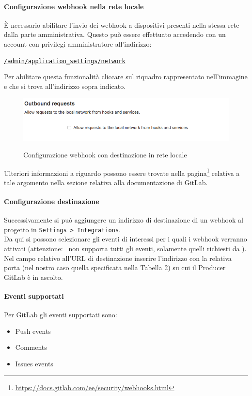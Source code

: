 	\paragraph{Configurazione webhook nella rete locale}
	È necessario abilitare l'invio dei webhook a dispositivi presenti nella stessa rete dalla parte amministrativa.
	Questo può essere effettuato accedendo con un account con privilegi amministratore all'indirizzo:
	\begin{center}
		\texttt{\url{/admin/application_settings/network}}
	\end{center}
	Per abilitare questa funzionalità cliccare sul riquadro rappresentato nell'immagine e che si trova all'indirizzo sopra indicato.
	\begin{figure}[H]
		\centering
		\includegraphics[width=13cm]{img/webhook_gitlab_setup.png}\\
		\caption[Webhook, GitLab]{Configurazione webhook con destinazione in rete locale}
	\end{figure}
	Ulteriori informazioni a riguardo possono essere trovate nella pagina\footnote{\url{https://docs.gitlab.com/ee/security/webhooks.html}} relativa a tale argomento nella sezione relativa alla documentazione di GitLab.	

	\paragraph{Configurazione destinazione}
	Successivamente si può aggiungere un indirizzo di destinazione di un webhook al progetto in \texttt{Settings > Integrations}.\\
	Da qui si possono selezionare gli eventi di interessi per i quali i webhook verranno attivati (attenzione: \progetto~non supporta tutti gli eventi, solamente quelli richiesti da \II).\\
	Nel campo relativo all'URL di destinazione inserire l'indirizzo con la relativa porta (nel nostro caso quella specificata nella Tabella 2) su cui il Producer GitLab è in ascolto.
	\paragraph{Eventi supportati}
	Per GitLab gli eventi supportati sono:
	\begin{itemize}
		\item Push events
		\item Comments
		\item Issues events
	\end{itemize}

